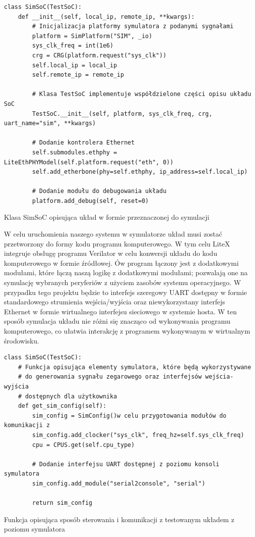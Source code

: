 \begin{longlisting}
\begin{verbatim}
class SimSoC(TestSoC):
    def __init__(self, local_ip, remote_ip, **kwargs):
        # Inicjalizacja platformy symulatora z podanymi sygnałami
        platform = SimPlatform("SIM", _io)
        sys_clk_freq = int(1e6)
        crg = CRG(platform.request("sys_clk"))
        self.local_ip = local_ip
        self.remote_ip = remote_ip

        # Klasa TestSoC implementuje współdzielone części opisu układu SoC
        TestSoC.__init__(self, platform, sys_clk_freq, crg, uart_name="sim", **kwargs)

        # Dodanie kontrolera Ethernet
        self.submodules.ethphy = LiteEthPHYModel(self.platform.request("eth", 0))
        self.add_etherbone(phy=self.ethphy, ip_address=self.local_ip)

        # Dodanie modułu do debugowania układu
        platform.add_debug(self, reset=0)
\end{verbatim}
\caption{\label{lst:tooling-litex-sim-soc}Klasa SimSoC opisująca układ w formie przeznaczonej do symulacji}
\end{longlisting}

W celu uruchomienia naszego systemu w symulatorze układ musi zostać przetworzony do formy kodu programu komputerowego. W tym celu LiteX integruje obsługę programu Verilator\cite{verilator:2016:Online} w celu konwersji układu do kodu komputerowego w formie źródłowej. Ów program łączony jest z dodatkowymi modułami, które łączą naszą logikę z dodatkowymi modułami; pozwalają one na symulację wybranych peryferiów z użyciem zasobów systemu operacyjnego. W przypadku tego projektu będzie to interfejs szeregowy UART dostępny w formie standardowego strumienia wejścia/wyjścia oraz niewykorzystany interfejs Ethernet w formie wirtualnego interfejsu sieciowego w systemie hosta. W ten sposób symulacja układu nie różni się znacząco od wykonywania programu komputerowego, co ułatwia interakcję z programem wykonywanym w wirtualnym środowisku.

\begin{longlisting}
\begin{verbatim}
class SimSoC(TestSoC):
    # Funkcja opisująca elementy symulatora, które będą wykorzystywane
    # do generowania sygnału zegarowego oraz interfejsów wejścia-wyjścia
    # dostępnych dla użytkownika
    def get_sim_config(self):
        sim_config = SimConfig()w celu przygotowania modułów do komunikacji z
        sim_config.add_clocker("sys_clk", freq_hz=self.sys_clk_freq)
        cpu = CPUS.get(self.cpu_type)

        # Dodanie interfejsu UART dostępnej z poziomu konsoli symulatora
        sim_config.add_module("serial2console", "serial")

        return sim_config
\end{verbatim}
\caption{\label{lst:tooling-litex-sim-config}Funkcja opisująca sposób sterowania i komunikacji z testowanym układem z poziomu symulatora}
\end{longlisting}

